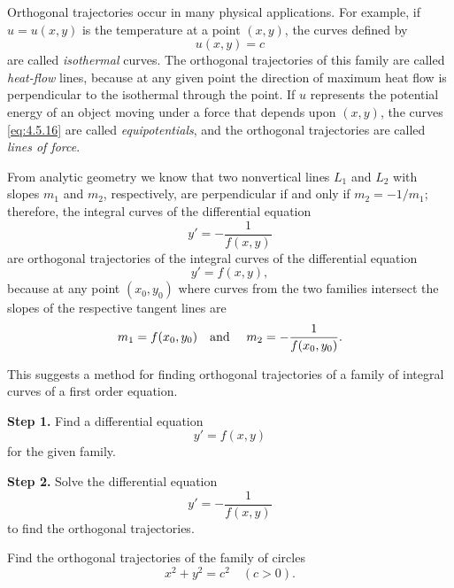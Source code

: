 Orthogonal trajectories occur in many physical applications. For example, if $u=u(x,y)$ is the
temperature at a point $(x,y)$, the curves defined by
\begin{equation}
  \label{eq:4.5.16}u(x,y)=c
\end{equation}
are called {\color{blue}\it isothermal\/} curves. The orthogonal trajectories of this family are
called {\color{blue}\it heat-flow\/} lines, because at any given point the direction of maximum heat
flow is perpendicular to the isothermal through the point. If $u$ represents the potential energy of
an object moving under a force that depends upon $(x,y)$, the curves \eqref{eq:4.5.16} are called
{\color{blue}\it equipotentials\/}, and the orthogonal trajectories are called {\color{blue}\it
lines of force\/}.

From analytic geometry we know that two nonvertical lines $L_{1}$ and $L_{2}$ with slopes $m_{1}$
and $m_{2}$, respectively, are perpendicular if and only if $m_{2}=-1/m_{1}$; therefore, the
integral curves of the differential equation
\[
  y'=-\frac{1}{f(x,y)}
\]
are orthogonal trajectories of the integral curves of the differential equation
\[
  y'=f(x,y),
\]
because at any point $(x_{0},y_{0})$ where curves from the two families intersect the slopes of the
respective tangent lines are
\[
  m_{1}=f(x_{0},y_{0})\mbox{\quad and \quad}m_{2}=-\frac{1}{f(x_{0},y_{0})}.
\]

This suggests a method for finding orthogonal trajectories of a family of integral curves of a first
order equation.


{\bf Step 1.} Find a differential equation
\[
  y'=f(x,y)
\]
for the given family.

\medskip

{\bf Step 2.} Solve the differential equation
\[
  y'=-\frac{1}{f(x,y)}
\]
to find the orthogonal trajectories.

\begin{example}
  \label{example:4.5.9} \rm Find the orthogonal trajectories of the family of circles
  \begin{equation}
    \label{eq:4.5.17}x^{2}+y^{2}=c^{2}\quad(c>0).
  \end{equation}
\end{example}

